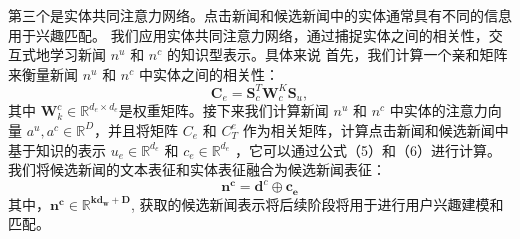 \documentclass[withoutpreface,bwprint]{cumcmthesis} %
\begin{document}
	第三个是实体共同注意力网络。点击新闻和候选新闻中的实体通常具有不同的信息用于兴趣匹配。
	我们应用实体共同注意力网络，通过捕捉实体之间的相关性，交互式地学习新闻 $n^u$ 和 $n^c$ 的知识型表示。具体来说
	首先，我们计算一个亲和矩阵来衡量新闻 $n^u$ 和 $n^c$ 中实体之间的相关性：
	\begin{equation}
	\mathbf{C}_e = \mathbf{S}^T_c\mathbf{W}^K_c\mathbf{S}_u,
	\end{equation}
	其中 $\mathbf{W}^c_k \in \mathbb{R}^{d_e \times d_e}$是权重矩阵。接下来我们计算新闻 $n^u$ 和 $n^c$ 中实体的注意力向量 $a^u,a^c \in \mathbb{R}^{D}$，并且将矩阵 $C_e$ 和 $C^e_T$ 作为相关矩阵，计算点击新闻和候选新闻中基于知识的表示 $u_e \in \mathbb{R}^{d_e}$ 和 $c_e \in \mathbb{R}^{d_e}$ ，它可以通过公式（5）和（6）进行计算。我们将候选新闻的文本表征和实体表征融合为候选新闻表征：
	\begin{equation}
	\mathbf{n^c}=\mathbf{d}^c \oplus \mathbf{c_e}
	\end{equation}
	其中，$\mathbf{n^c \in \mathbb{R}^{kd_w+D}}$, 获取的候选新闻表示将后续阶段将用于进行用户兴趣建模和匹配。
\end{document}
